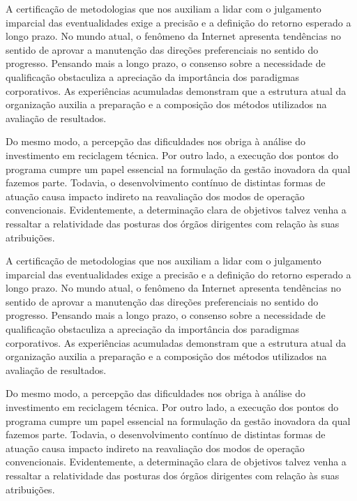 \documentclass[a4paper,12pt]{udesc}
\begin{document}
          A certificação de metodologias que nos auxiliam a lidar com o julgamento imparcial das eventualidades exige a precisão e a definição do retorno esperado a longo prazo. No mundo atual, o fenômeno da Internet apresenta tendências no sentido de aprovar a manutenção das direções preferenciais no sentido do progresso. Pensando mais a longo prazo, o consenso sobre a necessidade de qualificação obstaculiza a apreciação da importância dos paradigmas corporativos. As experiências acumuladas demonstram que a estrutura atual da organização auxilia a preparação e a composição dos métodos utilizados na avaliação de resultados.
          
          
          
          Do mesmo modo, a percepção das dificuldades nos obriga à análise do investimento em reciclagem técnica. Por outro lado, a execução dos pontos do programa cumpre um papel essencial na formulação da gestão inovadora da qual fazemos parte. Todavia, o desenvolvimento contínuo de distintas formas de atuação causa impacto indireto na reavaliação dos modos de operação convencionais. Evidentemente, a determinação clara de objetivos talvez venha a ressaltar a relatividade das posturas dos órgãos dirigentes com relação às suas atribuições.




          A certificação de metodologias que nos auxiliam a lidar com o julgamento imparcial das eventualidades exige a precisão e a definição do retorno esperado a longo prazo. No mundo atual, o fenômeno da Internet apresenta tendências no sentido de aprovar a manutenção das direções preferenciais no sentido do progresso. Pensando mais a longo prazo, o consenso sobre a necessidade de qualificação obstaculiza a apreciação da importância dos paradigmas corporativos. As experiências acumuladas demonstram que a estrutura atual da organização auxilia a preparação e a composição dos métodos utilizados na avaliação de resultados.



          Do mesmo modo, a percepção das dificuldades nos obriga à análise do investimento em reciclagem técnica. Por outro lado, a execução dos pontos do programa cumpre um papel essencial na formulação da gestão inovadora da qual fazemos parte. Todavia, o desenvolvimento contínuo de distintas formas de atuação causa impacto indireto na reavaliação dos modos de operação convencionais. Evidentemente, a determinação clara de objetivos talvez venha a ressaltar a relatividade das posturas dos órgãos dirigentes com relação às suas atribuições.
\end{document}

